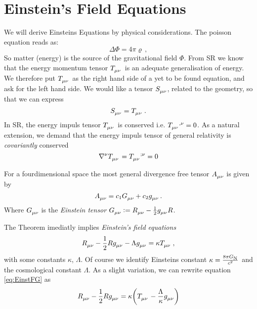\chapter{Einstein's Field Equations}
We will derive Einsteins Equations by physical considerations. The poisson
equation reads as:
\begin{equation}
\Delta\Phi=4\pi\varrho\, ,
\end{equation}
So matter (energy) is the source of the gravitational field $\Phi$.  From SR we
know that the energy momentum tensor $\tensor{T}{_\mu_\nu}$ is an adequate
generalisation of energy.
We therefore put $\tensor{T}{_\mu_\nu}$ as the right hand side of a yet to be
found equation, and ask for the left hand side. We would like a tensor
$\tensor{S}{_\mu_\nu}$, related to the geometry, so that we can express
\begin{equation}
\tensor{S}{_\mu_\nu}=\tensor{T}{_\mu_\nu}
\,.
\end{equation}
In SR, the energy impuls tensor $\tensor{T}{_\mu_\nu}$ is conserved i.e.
$\tensor{T}{_\mu_\nu^{,\nu}}=0$. As a natural extension, we demand that the
energy impuls tensor of general relativity is \emph{covariantly} conserved
\begin{equation}
\tensor{\nabla}{^\nu}\tensor{T}{_\mu_\nu}=\tensor{T}{_\mu_\nu^{;\nu}}=0
\end{equation}
\begin{theorem}[Lovelock]
For a fourdimensional space
\footnotemark{} the most general divergence free tensor $\tensor{A}{_\mu_\nu}$ is
given by
\begin{equation}
\tensor{A}{_\mu_\nu}= c_1\tensor{G}{_\mu_\nu}+c_2\tensor{g}{_\mu_\nu}\, .
\end{equation}
Where $\tensor{G}{_\mu_\nu}$ is the \emph{Einstein tensor}
$\tensor{G}{_\mu_\nu}:=\tensor{R}{_\mu_\nu}-\frac{1}{2}\tensor{g}{_\mu_\nu}R$.
\end{theorem}
The Theorem imediatly implies \emph{Einstein's field equations}
\begin{equation}
\tensor{R}{_\mu_\nu}-\frac{1}{2}R\tensor{g}{_\mu_\nu}-\Lambda\tensor{g}{_\mu_\nu}
=\kappa\tensor{T}{_\mu_\nu}\, ,\label{eq:EinstFG}
\end{equation}
with some constants $\kappa$, $\Lambda$.
Of course we identify Einsteins constant $\kappa=\frac{8\pi
G\textsubscript{N}}{c^2}$ and the cosmological constant $\Lambda$. As a slight
variation, we can rewrite equation \eqref{eq:EinstFG} as
\begin{equation}
\tensor{R}{_\mu_\nu}-\frac{1}{2}R\tensor{g}{_\mu_\nu}
=\kappa\left(\tensor{T}{_\mu_\nu}-\frac{\Lambda}{\kappa}\tensor{g}{_\mu_\nu}\right)
\end{equation}
